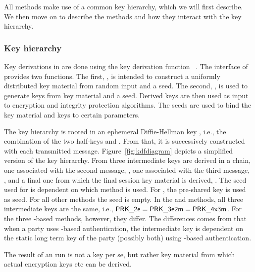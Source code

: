 All methods make use of a common key hierarchy, which we will first describe.
%
We then move on to describe the methods and how they interact with the
key hierarchy.
%

\subsubsection{Key hierarchy}
\label{sec:keyHierarchy}
Key derivations in \mEdhoc{} are done using the key derivation function
\mHkdf{}~\cite{rfc5869}.
%
The interface of \mHkdf{} provides two functions.
%
The first, \mHkdfExtract{}, is intended to construct a uniformly distributed
key material from random input and a seed.
%
The second, \mHkdfExpand{}, is used to generate keys from key material and a
seed.
%
Derived keys are then used as input to encryption and integrity protection
algorithms.
%
The seeds are used to bind the key material and keys to certain parameters.
%

The key hierarchy is rooted in an ephemeral Diffie-Hellman key \mGxy{}, i.e.,
the combination of the two half-keys \mGx{} and \mGy{}.
%
From that, it is successively constructed with each transmitted message.
%
Figure~\ref{fig:kdfdiagram} depicts a simplified version of the key hierarchy.
%
From \mGxy{} three intermediate keys are derived in a chain, one associated
with the second message,
\mPRKtwo{}, one associated with the third message, \mPRKthree{}, and a
final one from which the final session key material is derived, \mPRKfour{}.
%
The seed used for \mPRKtwo{} is dependent on which method is used.
%
For \mPskPsk{}, the pre-shared key is used as seed.
%
For all other methods the seed is empty.
%
In the \mPskPsk{} and \mSigSig{} methods, all three intermediate keys
are the same, i.e., $\text{\textup{\textsf{PRK\_2e}}}{} = \text{\textup{\textsf{PRK\_3e2m}}}{} = \text{\textup{\textsf{PRK\_4x3m}}}$.
%
For the three \mStat-based methods, however, they differ.
%
The differences comes from that when a party uses \mStat{}-based authentication,
the intermediate key \mPRKthree{} is dependent on the static long term key of
the party (possibly both) using \mStat{}-based authentication.
%

The result of an \mEdhoc{} run is not a key per se, but rather key material from
which actual encryption keys etc can be derived.
%



